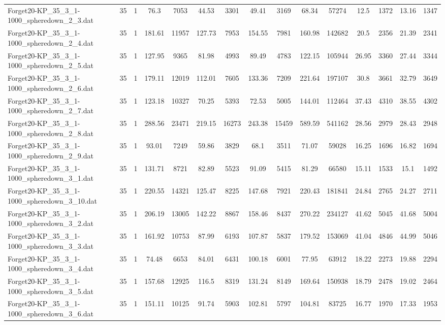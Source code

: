 \begin{table}[!ht]
{\begin{tabular}{lcccccccccccccc}
Forget20-KP\_35\_3\_1-1000\_spheredown\_2\_3.dat & 35 & 1 & 76.3 & 7053 & 44.53 & 3301 & 49.41 & 3169 & 68.34 & 57274 & 12.5 & 1372 & 13.16 & 1347 \\
Forget20-KP\_35\_3\_1-1000\_spheredown\_2\_4.dat & 35 & 1 & 181.61 & 11957 & 127.73 & 7953 & 154.55 & 7981 & 160.98 & 142682 & 20.5 & 2356 & 21.39 & 2341 \\
Forget20-KP\_35\_3\_1-1000\_spheredown\_2\_5.dat & 35 & 1 & 127.95 & 9365 & 81.98 & 4993 & 89.49 & 4783 & 122.15 & 105944 & 26.95 & 3360 & 27.44 & 3344 \\
Forget20-KP\_35\_3\_1-1000\_spheredown\_2\_6.dat & 35 & 1 & 179.11 & 12019 & 112.01 & 7605 & 133.36 & 7209 & 221.64 & 197107 & 30.8 & 3661 & 32.79 & 3649 \\
Forget20-KP\_35\_3\_1-1000\_spheredown\_2\_7.dat & 35 & 1 & 123.18 & 10327 & 70.25 & 5393 & 72.53 & 5005 & 144.01 & 112464 & 37.43 & 4310 & 38.55 & 4302 \\
Forget20-KP\_35\_3\_1-1000\_spheredown\_2\_8.dat & 35 & 1 & 288.56 & 23471 & 219.15 & 16273 & 243.38 & 15459 & 589.59 & 541162 & 28.56 & 2979 & 28.43 & 2948 \\
Forget20-KP\_35\_3\_1-1000\_spheredown\_2\_9.dat & 35 & 1 & 93.01 & 7249 & 59.86 & 3829 & 68.1 & 3511 & 71.07 & 59028 & 16.25 & 1696 & 16.82 & 1694 \\
Forget20-KP\_35\_3\_1-1000\_spheredown\_3\_1.dat & 35 & 1 & 131.71 & 8721 & 82.89 & 5523 & 91.09 & 5415 & 81.29 & 66580 & 15.11 & 1533 & 15.1 & 1492 \\
Forget20-KP\_35\_3\_1-1000\_spheredown\_3\_10.dat & 35 & 1 & 220.55 & 14321 & 125.47 & 8225 & 147.68 & 7921 & 220.43 & 181841 & 24.84 & 2765 & 24.27 & 2711 \\
Forget20-KP\_35\_3\_1-1000\_spheredown\_3\_2.dat & 35 & 1 & 206.19 & 13005 & 142.22 & 8867 & 158.46 & 8437 & 270.22 & 234127 & 41.62 & 5045 & 41.68 & 5004 \\
Forget20-KP\_35\_3\_1-1000\_spheredown\_3\_3.dat & 35 & 1 & 161.92 & 10753 & 87.99 & 6193 & 107.87 & 5837 & 179.52 & 153069 & 41.04 & 4846 & 44.99 & 5046 \\
Forget20-KP\_35\_3\_1-1000\_spheredown\_3\_4.dat & 35 & 1 & 74.48 & 6653 & 84.01 & 6431 & 100.18 & 6001 & 77.95 & 63912 & 18.22 & 2273 & 19.88 & 2294 \\
Forget20-KP\_35\_3\_1-1000\_spheredown\_3\_5.dat & 35 & 1 & 157.68 & 12925 & 116.5 & 8319 & 131.24 & 8149 & 169.64 & 150938 & 18.79 & 2478 & 19.02 & 2464 \\
Forget20-KP\_35\_3\_1-1000\_spheredown\_3\_6.dat & 35 & 1 & 151.11 & 10125 & 91.74 & 5903 & 102.81 & 5797 & 104.81 & 83725 & 16.77 & 1970 & 17.33 & 1953 \\

\end{tabular}}
\end{table}
